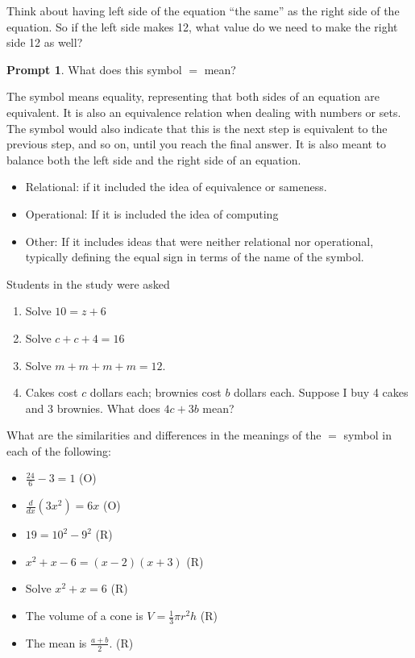 \documentclass[11pt]{article}
\theoremstyle{definition}\newtheorem{definition}{Definition}
\theoremstyle{definition}\newtheorem{question}{Question}
\theoremstyle{definition}\newtheorem*{solution}{Solution}
\theoremstyle{definition}\newtheorem{example}{Example}
\theoremstyle{definition}\newtheorem{notation}{Notation}
\theoremstyle{theorem}\newtheorem{theorem}{Theorem}
\theoremstyle{theorem}\newtheorem{corollary}{Corollary}
\theoremstyle{theorem}\newtheorem{lemma}{Lemma}
\theoremstyle{theorem}\newtheorem{proposition}{Proposition}
\theoremstyle{theorem}\newtheorem{prompt}{Prompt}
\begin{document}
Think about having left side of the equation ``the same'' as the right side of the equation. So if the left side makes 12, what value do we need to make the right side 12 as well?

\begin{prompt}
    What does this symbol $=$ mean?
\end{prompt}

The symbol means equality, representing that both sides of an equation are equivalent. It is also an equivalence relation when dealing with numbers or sets. The symbol would also indicate that this is the next step is equivalent to the previous step, and so on, until you reach the final answer. It is also meant to balance both the left side and the right side of an equation.
\begin{itemize}
    \item Relational: if it included the idea of equivalence or sameness.
    \item Operational: If it is included the idea of computing
    \item Other: If it includes ideas that were neither relational nor operational, typically defining the equal sign in terms of the name of the symbol.
\end{itemize}

Students in the study were asked
\begin{enumerate}
    \item Solve $10  =z + 6$
    \item Solve $c + c + 4 = 16$
    \item Solve $m + m + m + m = 12$.
    \item Cakes cost $c$ dollars each; brownies cost $b$ dollars each. Suppose I buy 4 cakes and 3 brownies. What does $4c + 3b$ mean?
\end{enumerate}

What are the similarities and differences in the meanings of the $=$ symbol in each of the following:
\begin{itemize}
    \item $\frac{24}{6} - 3 = 1$ (O)
    \item $\frac{d}{dx}(3x^2) = 6x$ (O)
    \item $19 = 10^2 - 9^2$ (R)
    \item $x^2 + x - 6 = (x - 2)(x + 3)$ (R)
    \item Solve $x^2 + x = 6$ (R)
    \item The volume of a cone is $V = \frac{1}{3}\pi r^2 h$ (R)
    \item The mean is $\frac{a + b}{2}$. (R)
\end{itemize}
\end{document}
